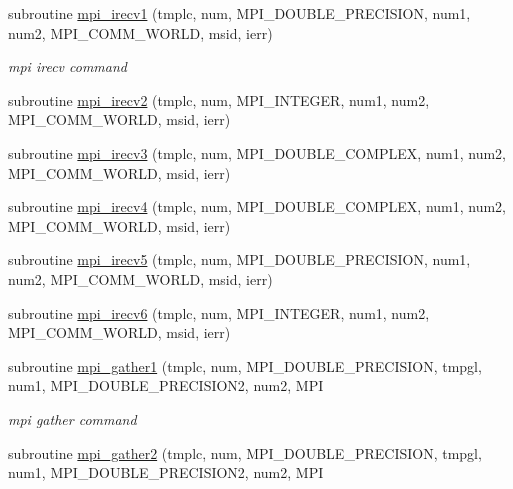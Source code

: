 \begin{DoxyCompactItemize}
subroutine \mbox{\hyperlink{namespacempistub_ada728226719e1870c85e45f6594cccbd}{mpi\+\_\+irecv1}} (tmplc, num, M\+P\+I\+\_\+\+D\+O\+U\+B\+L\+E\+\_\+\+P\+R\+E\+C\+I\+S\+I\+ON, num1, num2, M\+P\+I\+\_\+\+C\+O\+M\+M\+\_\+\+W\+O\+R\+LD, msid, ierr)
\begin{DoxyCompactList}\small\item\em mpi irecv command \end{DoxyCompactList}\item 
subroutine \mbox{\hyperlink{namespacempistub_a3f6d6a1e356cf0bed0327c5b9df47498}{mpi\+\_\+irecv2}} (tmplc, num, M\+P\+I\+\_\+\+I\+N\+T\+E\+G\+ER, num1, num2, M\+P\+I\+\_\+\+C\+O\+M\+M\+\_\+\+W\+O\+R\+LD, msid, ierr)
\item 
subroutine \mbox{\hyperlink{namespacempistub_ad39ca4d74dbf2a6bc63895fa2503e945}{mpi\+\_\+irecv3}} (tmplc, num, M\+P\+I\+\_\+\+D\+O\+U\+B\+L\+E\+\_\+\+C\+O\+M\+P\+L\+EX, num1, num2, M\+P\+I\+\_\+\+C\+O\+M\+M\+\_\+\+W\+O\+R\+LD, msid, ierr)
\item 
subroutine \mbox{\hyperlink{namespacempistub_a99d8cacbf221fe5a3829f6dbc22159a6}{mpi\+\_\+irecv4}} (tmplc, num, M\+P\+I\+\_\+\+D\+O\+U\+B\+L\+E\+\_\+\+C\+O\+M\+P\+L\+EX, num1, num2, M\+P\+I\+\_\+\+C\+O\+M\+M\+\_\+\+W\+O\+R\+LD, msid, ierr)
\item 
subroutine \mbox{\hyperlink{namespacempistub_a42635e07cedd999352dec8ee45a378f5}{mpi\+\_\+irecv5}} (tmplc, num, M\+P\+I\+\_\+\+D\+O\+U\+B\+L\+E\+\_\+\+P\+R\+E\+C\+I\+S\+I\+ON, num1, num2, M\+P\+I\+\_\+\+C\+O\+M\+M\+\_\+\+W\+O\+R\+LD, msid, ierr)
\item 
subroutine \mbox{\hyperlink{namespacempistub_a38d4bf89b91c8dac22d310c6e73ced41}{mpi\+\_\+irecv6}} (tmplc, num, M\+P\+I\+\_\+\+I\+N\+T\+E\+G\+ER, num1, num2, M\+P\+I\+\_\+\+C\+O\+M\+M\+\_\+\+W\+O\+R\+LD, msid, ierr)
\item 
subroutine \mbox{\hyperlink{namespacempistub_a3e61dfb24d3caebd2c2983a9e4ab3dfd}{mpi\+\_\+gather1}} (tmplc, num, M\+P\+I\+\_\+\+D\+O\+U\+B\+L\+E\+\_\+\+P\+R\+E\+C\+I\+S\+I\+ON, tmpgl, num1, M\+P\+I\+\_\+\+D\+O\+U\+B\+L\+E\+\_\+\+P\+R\+E\+C\+I\+S\+I\+O\+N2, num2, M\+PI
\begin{DoxyCompactList}\small\item\em mpi gather command \end{DoxyCompactList}\item 
subroutine \mbox{\hyperlink{namespacempistub_a9be56b07b004daadf8c9baeb3f79a9eb}{mpi\+\_\+gather2}} (tmplc, num, M\+P\+I\+\_\+\+D\+O\+U\+B\+L\+E\+\_\+\+P\+R\+E\+C\+I\+S\+I\+ON, tmpgl, num1, M\+P\+I\+\_\+\+D\+O\+U\+B\+L\+E\+\_\+\+P\+R\+E\+C\+I\+S\+I\+O\+N2, num2, M\+PI

\end{DoxyCompactItemize}
